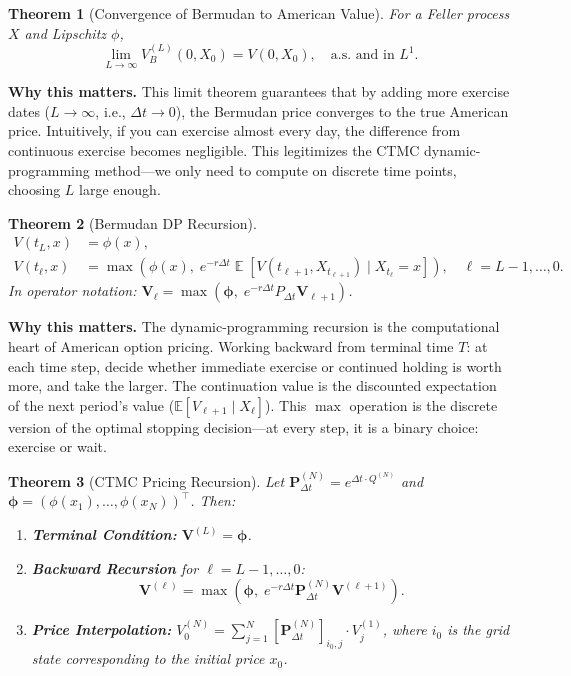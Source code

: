 \documentclass[11pt,a4paper,openany]{book}
\theoremstyle{definition}
\theoremstyle{plain}
\newtheorem{theorem}{Theorem}[chapter]
\theoremstyle{remark}
\DeclareMathOperator{\E}{\mathbb{E}}
\newcommand{\1}{\mathbbm{1}}
\begin{document}
\begin{theorem}[Convergence of Bermudan to American Value]
For a Feller process $X$ and Lipschitz $\phi$,
\[
\lim_{L \to \infty} V_{B}^{(L)}(0, X_{0}) = V(0, X_{0}), \quad \text{a.s.\ and in } L^{1}.
\]
\end{theorem}

\medskip
\noindent\textbf{Why this matters.} This limit theorem guarantees that by adding more exercise dates ($L \to \infty$, i.e., $\Delta t \to 0$), the Bermudan price converges to the true American price. Intuitively, if you can exercise almost every day, the difference from continuous exercise becomes negligible. This legitimizes the CTMC dynamic-programming method---we only need to compute on discrete time points, choosing $L$ large enough.

\begin{theorem}[Bermudan DP Recursion]
\[
\begin{aligned}
V(t_{L}, x) &= \phi(x), \\
V(t_{\ell}, x) &= \max\left(\phi(x), \; e^{-r \Delta t} \E\left[V(t_{\ell+1}, X_{t_{\ell+1}}) \mid X_{t_{\ell}} = x\right]\right), \quad \ell = L-1, \ldots, 0.
\end{aligned}
\]
In operator notation: $\mathbf{V}_{\ell} = \max(\boldsymbol{\phi}, \; e^{-r \Delta t} P_{\Delta t} \mathbf{V}_{\ell+1})$.
\end{theorem}

\medskip
\noindent\textbf{Why this matters.} The dynamic-programming recursion is the computational heart of American option pricing. Working backward from terminal time $T$: at each time step, decide whether immediate exercise or continued holding is worth more, and take the larger. The continuation value is the discounted expectation of the next period's value ($\mathbb{E}[V_{\ell+1} \mid X_{\ell}]$). This $\max$ operation is the discrete version of the optimal stopping decision---at every step, it is a binary choice: exercise or wait.

\begin{theorem}[CTMC Pricing Recursion]
Let $\mathbf{P}_{\Delta t}^{(N)} = e^{\Delta t \cdot Q^{(N)}}$ and $\boldsymbol{\phi} = (\phi(x_{1}), \ldots, \phi(x_{N}))^{\top}$. Then:
\begin{enumerate}[label=(\arabic*)]
    \item \textbf{Terminal Condition:} $\mathbf{V}^{(L)} = \boldsymbol{\phi}$.
    \item \textbf{Backward Recursion} for $\ell = L-1, \ldots, 0$:
    \[
    \mathbf{V}^{(\ell)} = \max\left(\boldsymbol{\phi}, \; e^{-r \Delta t} \mathbf{P}_{\Delta t}^{(N)} \mathbf{V}^{(\ell+1)}\right).
    \]
    \item \textbf{Price Interpolation:} $V_{0}^{(N)} = \sum_{j=1}^{N} [\mathbf{P}_{\Delta t}^{(N)}]_{i_{0}, j} \cdot V_{j}^{(1)}$, where $i_{0}$ is the grid state corresponding to the initial price $x_{0}$.
\end{enumerate}
\end{theorem}
\end{document}
